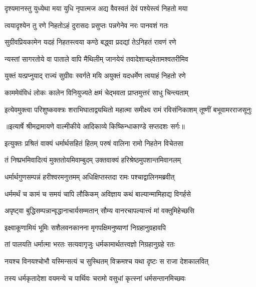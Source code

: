 \twolineshloka
{दृश्यमानस्तु युध्येथा मया युधि नृपात्मज}
{अद्य वैवस्वतं देवं पश्येस्त्वं निहतो मया} %

\twolineshloka
{त्वयादृश्येन तु रणे निहतोऽहं दुरासदः}
{प्रसुप्तः पन्नगेनेव नरः पानवशं गतः} %

\twolineshloka
{सुग्रीवप्रियकामेन यदहं निहतस्त्वया}
{कण्ठे बद्ध्वा प्रदद्यां तेऽनिहतं रावणं रणे} %

\twolineshloka
{न्यस्तां सागरतोये वा पाताले वापि मैथिलीम्}
{जानयेयं तवादेशाच्छ्वेतामश्वतरीमिव} %

\twolineshloka
{युक्तं यत्प्रप्नुयाद् राज्यं सुग्रीवः स्वर्गते मयि}
{अयुक्तं यदधर्मेण त्वयाहं निहतो रणे} %

\twolineshloka
{काममेवंविधं लोकः कालेन विनियुज्यते}
{क्षमं चेद्भवता प्राप्तमुत्तरं साधु चिन्त्यताम्} %

\fourlineindentedshloka
{इत्येवमुक्त्वा परिशुष्कवक्त्रः}
{शराभिघाताद्व्यथितो महात्मा}
{समीक्ष्य रामं रविसंनिकाशम्}
{तूष्णीं बभूवामरराजसूनुः} %


{॥इत्यार्षे श्रीमद्रामायणे वाल्मीकीये आदिकाव्ये किष्किन्धाकाण्डे सप्तदशः सर्गः॥}


\twolineshloka
{इत्युक्तः प्रश्रितं वाक्यं धर्मार्थसहितं हितम्}
{परुषं वालिना रामो निहतेन विचेतसा} %

\twolineshloka
{तं निष्प्रभमिवादित्यं मुक्ततोयमिवाम्बुदम्}
{उक्तवाक्यं हरिश्रेष्ठमुपशान्तमिवानलम्} %

\twolineshloka
{धर्मार्थगुणसम्पन्नं हरीश्वरमनुत्तमम्}
{अधिक्षिप्तस्तदा रामः पश्चाद्वालिनमब्रवीत्} %

\twolineshloka
{धर्ममर्थं च कामं च समयं चापि लौकिकम्}
{अविज्ञाय कथं बाल्यान्मामिहाद्य विगर्हसे} %

\twolineshloka
{अपृष्ट्वा बुद्धिसम्पन्नान्वृद्धानाचार्यसम्मतान्}
{सौम्य वानरचापल्यात्त्वं मां वक्तुमिहेच्छसि} %

\twolineshloka
{इक्ष्वाकूणामियं भूमिः सशैलवनकानना}
{मृगपक्षिमनुष्याणां निग्रहानुग्रहावपि} %

\twolineshloka
{तां पालयति धर्मात्मा भरतः सत्यवागृजुः}
{धर्मकामार्थतत्त्वज्ञो निग्रहानुग्रहे रतः} %

\twolineshloka
{नयश्च विनयश्चोभौ यस्मिन्सत्यं च सुस्थितम्}
{विक्रमश्च यथा दृष्टः स राजा देशकालवित्} %

\twolineshloka
{तस्य धर्मकृतादेशा वयमन्ये च पार्थिवः}
{चरामो वसुधां कृत्स्नां धर्मसन्तानमिच्छवः} %

